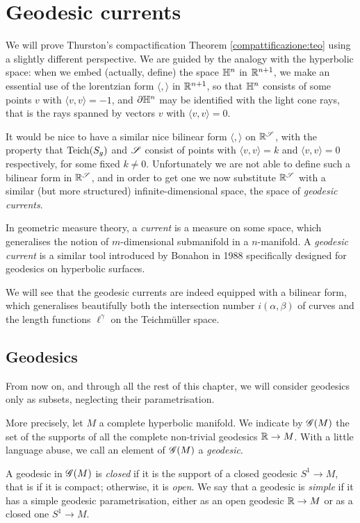 \section{Geodesic currents}
We will prove Thurston's compactification Theorem \ref{compattificazione:teo} using a slightly different perspective. We are guided by the analogy with the hyperbolic space: when we embed (actually, define) the space $\mathbb{H}^n$ in $\mathbb{R}^{n+1}$, we make an essential use of the lorentzian form $\langle,\rangle$ in $\mathbb{R}^{n+1}$, so that $\mathbb{H}^n$ consists of some points $v$ with $\langle v,v \rangle = -1$, and $\partial \mathbb{H}^n$ may be identified with the light cone rays, that is the rays spanned by vectors $v$ with $\langle v , v \rangle = 0$.

It would be nice to have a similar nice bilinear form $\langle,\rangle$ on $\mathbb{R}^\mathscr{S}$, with the property that ${\rm Teich}(S_g)$ and $\mathscr{S}$ consist of points with $\langle v,v\rangle = k$ and $\langle v, v \rangle = 0$ respectively, for some fixed $k\neq 0$. Unfortunately we are not able to define such a bilinear form in $\mathbb{R}^\mathscr{S}$, and in order to get one we now substitute $\mathbb{R}^\mathscr{S}$ with a similar (but more structured) infinite-dimensional space, the space of \emph{geodesic currents}.

In geometric measure theory, a \emph{current} is a measure on some space, which generalises the notion of $m$-dimensional submanifold in a $n$-manifold. A \emph{geodesic current} is a similar tool introduced by Bonahon in 1988 specifically designed for geodesics on hyperbolic surfaces.

We will see that the geodesic currents are indeed equipped with a bilinear form, which generalises beautifully both the intersection number $i(\alpha, \beta)$ of curves and the length functions $\ell^\gamma$ on the Teichm\"uller space.

\subsection{Geodesics}
From now on, and through all the rest of this chapter, we will consider geodesics only as subsets, neglecting their parametrisation.

More precisely, let $M$ a complete hyperbolic manifold. We indicate by $\mathscr{G}(M)$ the set of the supports of all the complete non-trivial geodesics $\mathbb{R} \to M$. With a little language abuse, we call an element of $\mathscr{G}(M)$ a \emph{geodesic}. 

A geodesic in $\mathscr{G}(M)$ is \emph{closed} if it is the support of a closed geodesic $S^1 \to M$, that is if it is compact; otherwise, it is \emph{open}. We say that a geodesic is \emph{simple} if it has a simple geodesic parametrisation, either as an open geodesic $\mathbb{R} \to M$ or as a closed one $S^1 \to M$. 
  
